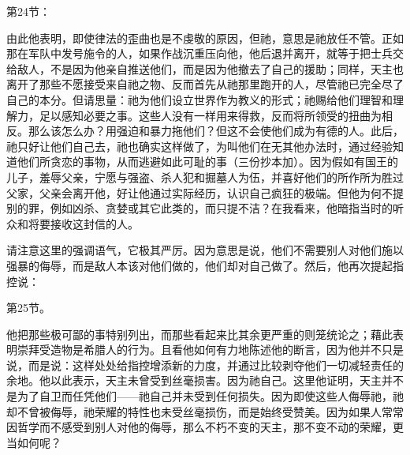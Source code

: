 第24节：\par

由此他表明，即使律法的歪曲也是不虔敬的原因，但祂，意思是祂放任不管。正如那在军队中发号施令的人，如果作战沉重压向他，他后退并离开，就等于把士兵交给敌人，不是因为他亲自推送他们，而是因为他撤去了自己的援助；同样，天主也离开了那些不愿接受来自祂之物、反而首先从祂那里跑开的人，尽管祂已完全尽了自己的本分。但请思量：祂为他们设立世界作为教义的形式；祂赐给他们理智和理解力，足以感知必要之事。这些人没有一样用来得救，反而将所领受的扭曲为相反。那么该怎么办？用强迫和暴力拖他们？但这不会使他们成为有德的人。此后，祂只好让他们自己去，祂也确实这样做了，为叫他们在无其他办法时，通过经验知道他们所贪恋的事物，从而逃避如此可耻的事（三份抄本加）。因为假如有国王的儿子，羞辱父亲，宁愿与强盗、杀人犯和掘墓人为伍，并喜好他们的所作所为胜过父家，父亲会离开他，好让他通过实际经历，认识自己疯狂的极端。但他为何不提别的罪，例如凶杀、贪婪或其它此类的，而只提不洁？在我看来，他暗指当时的听众和将要接收这封信的人。\par

请注意这里的强调语气，它极其严厉。因为意思是说，他们不需要别人对他们施以强暴的侮辱，而是敌人本该对他们做的，他们却对自己做了。然后，他再次提起指控说：\par

第25节。\par

他把那些极可鄙的事特别列出，而那些看起来比其余更严重的则笼统论之；藉此表明崇拜受造物是希腊人的行为。且看他如何有力地陈述他的断言，因为他并不只是说，而是说：这样处处给指控增添新的力度，并通过比较剥夺他们一切减轻责任的余地。他以此表示，天主未曾受到丝毫损害。因为祂自己。这里他证明，天主并不是为了自卫而任凭他们——祂自己并未受到任何损失。因为即使这些人侮辱祂，祂却不曾被侮辱，祂荣耀的特性也未受丝毫损伤，而是始终受赞美。因为如果人常常因哲学而不感受到别人对他的侮辱，那么不朽不变的天主，那不变不动的荣耀，更当如何呢？\par

